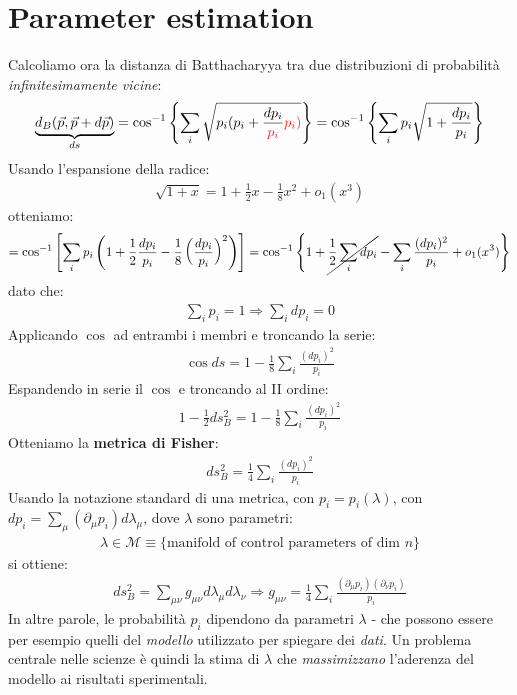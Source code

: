 \documentclass[../../InformazioneQuantistica.tex]{subfiles}
\begin{document}
\section{Parameter estimation}
Calcoliamo ora la distanza di Batthacharyya tra due distribuzioni di probabilità \textit{infinitesimamente vicine}:
\begin{align*}
\underbrace{d_B ( \vec{p}, \vec{p} + d\vec{p})}_{ds} = \cos^{-1}\left\{ \sum_i \sqrt{p_i(p_i+\frac{dp_i}{\color{Red}{p_i}} \color{Red}{p_i})} \right\} = \cos^{-1}\left\{\sum_i p_i \sqrt{1 + \frac{dp_i}{p_i}}\right\}
\end{align*}
Usando l'espansione della radice:
\begin{align*}
\sqrt{1+x} = 1 + \frac{1}{2}x-\frac{1}{8}x^2 + o_1(x^3)
\end{align*}
otteniamo:
\begin{align*}
= \cos^{-1} \left[ \sum_i p_i \left( 1+ \frac{1}{2}\frac{dp_i}{p_i} - \frac{1}{8}\left(\frac{dp_i}{p_i}\right)^2 \right) \right] = \cos^{-1} \left\{ 1+ \cancel{\frac{1}{2}\sum_i dp_i} - \sum_i \frac{(dp_i)^2}{p_i} + o_1(x^3) \right \}
\end{align*}
dato che:
\begin{align*}
\sum_i p_i = 1 \Rightarrow \sum_i dp_i = 0
\end{align*}
Applicando $\cos$ ad entrambi i membri e troncando la serie:
\begin{align*}
\cos ds = 1-\frac{1}{8} \sum_i \frac{(dp_i)^2}{p_i}
\end{align*}
Espandendo in serie il $\cos$ e troncando al II ordine:
\begin{align*}
1-\frac{1}{2} ds_B^2 = 1-\frac{1}{8} \sum_i \frac{(dp_i)^2}{p_i}
\end{align*}
Otteniamo la \textbf{metrica di Fisher}:
\begin{align*}
ds_B^2 = \frac{1}{4}\sum_i \frac{(dp_i)^2}{p_i}
\end{align*}
Usando la notazione standard di una metrica, con $p_i = p_i(\lambda)$, con $dp_i = \sum_\mu (\partial_\mu p_i) d\lambda_\mu$, dove $\lambda$ sono parametri:
\begin{align*}
\lambda \in \mathcal{M} \equiv \{ \text{manifold of control parameters of dim $n$}\}
\end{align*}
 si ottiene:
\begin{align*}
ds_B^2 = \sum_{\mu\nu} g_{\mu\nu} d \lambda_\mu d\lambda_\nu \Rightarrow g_{\mu\nu} = \frac{1}{4} \sum_i \frac{(\partial _\mu p_i) (\partial_\nu p_i)}{p_i}
\end{align*}
In altre parole, le probabilità $p_i$ dipendono da parametri $\lambda$ - che possono essere per esempio quelli del \textit{modello} utilizzato per spiegare dei \textit{dati}. Un problema centrale nelle scienze è quindi la stima di $\lambda$ che \textit{massimizzano} l'aderenza del modello ai risultati sperimentali.\\
\end{document}
